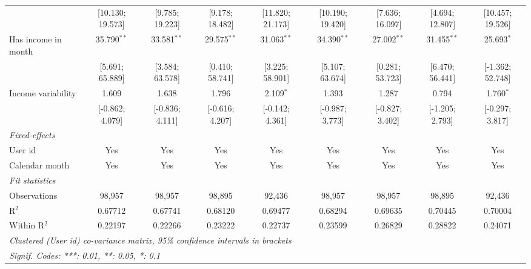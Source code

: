\begin{table}[htbp]
\begin{threeparttable}[b]
\begin{tabular}{lcccccccc}
                                          & [10.130; 19.573]   & [9.785; 19.223]    & [9.178; 18.482]    & [11.820; 21.173]   & [10.190; 19.420]    & [7.636; 16.097]      & [4.694; 12.807]      & [10.457; 19.526]\\   
         Has income in month              & 35.790$^{**}$      & 33.581$^{**}$      & 29.575$^{**}$      & 31.063$^{**}$      & 34.390$^{**}$       & 27.002$^{**}$        & 31.455$^{**}$        & 25.693$^{*}$\\   
                                          & [5.691; 65.889]    & [3.584; 63.578]    & [0.410; 58.741]    & [3.225; 58.901]    & [5.107; 63.674]     & [0.281; 53.723]      & [6.470; 56.441]      & [-1.362; 52.748]\\   
         Income variability               & 1.609              & 1.638              & 1.796              & 2.109$^{*}$        & 1.393               & 1.287                & 0.794                & 1.760$^{*}$\\   
                                          & [-0.862; 4.079]    & [-0.836; 4.111]    & [-0.616; 4.207]    & [-0.142; 4.361]    & [-0.987; 3.773]     & [-0.827; 3.402]      & [-1.205; 2.793]      & [-0.297; 3.817]\\   
         \midrule
         \emph{Fixed-effects}\\
         User id                          & Yes                & Yes                & Yes                & Yes                & Yes                 & Yes                  & Yes                  & Yes\\  
         Calendar month                   & Yes                & Yes                & Yes                & Yes                & Yes                 & Yes                  & Yes                  & Yes\\  
         \midrule
         \emph{Fit statistics}\\
         Observations                     & 98,957             & 98,957             & 98,895             & 92,436             & 98,957              & 98,957               & 98,895               & 92,436\\  
         R$^2$                            & 0.67712            & 0.67741            & 0.68120            & 0.69477            & 0.68294             & 0.69635              & 0.70445              & 0.70004\\  
         Within R$^2$                     & 0.22197            & 0.22266            & 0.23222            & 0.22737            & 0.23599             & 0.26829              & 0.28822              & 0.24071\\  
         \midrule \midrule
         \multicolumn{9}{l}{\emph{Clustered (User id) co-variance matrix, 95\% confidence intervals in brackets}}\\
         \multicolumn{9}{l}{\emph{Signif. Codes: ***: 0.01, **: 0.05, *: 0.1}}\\
      \end{tabular}
   \end{threeparttable}
\end{table}


